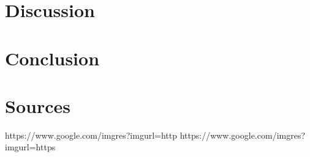 \documentclass[a4paper,10pt]{article}
\begin{document}
\section{Discussion}

\section{Conclusion}

\section{Sources}

https://www.google.com/imgres?imgurl=http%
https://www.google.com/imgres?imgurl=https%
\end{document}
